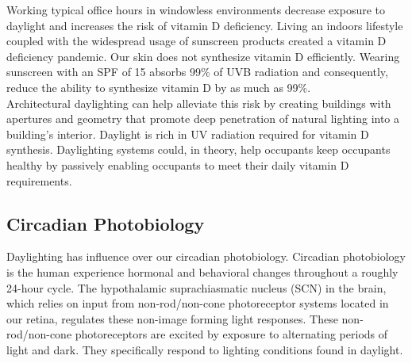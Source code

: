     Working typical office hours in windowless environments decrease exposure to daylight and increases the risk of vitamin D deficiency. Living an indoors lifestyle coupled with the widespread usage of sunscreen products created a vitamin D deficiency pandemic.  Our skin does not synthesize vitamin D efficiently. Wearing sunscreen with an SPF of 15 absorbs 99\% of UVB radiation and consequently, reduce the ability to synthesize vitamin D by as much as 99\%\cite{Holick}. \\

    Architectural daylighting can help alleviate this risk by creating buildings with apertures and geometry that promote deep penetration of natural lighting into a building's interior. Daylight is rich in UV radiation required for vitamin D synthesis.  Daylighting systems could, in theory, help occupants keep occupants healthy by passively enabling occupants to meet their daily vitamin D requirements. \\

  \subsection{Circadian Photobiology}
    Daylighting has influence over our circadian photobiology. Circadian photobiology is the human experience hormonal and behavioral changes throughout a roughly 24-hour cycle. The hypothalamic suprachiasmatic nucleus (SCN)  in the brain, which relies on input from non-rod/non-cone photoreceptor systems located in our retina, regulates these non-image forming light responses. These non-rod/non-cone photoreceptors are excited by exposure to alternating periods of light and dark. They specifically respond to lighting conditions found in daylight\cite{Rea,Thapan}.\\

